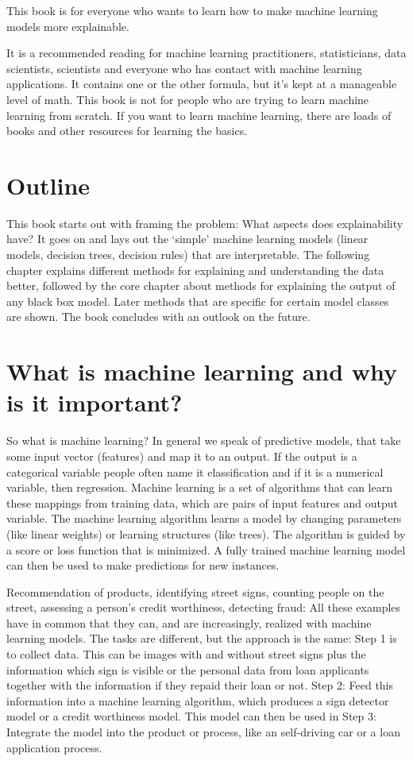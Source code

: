 \documentclass[12pt,]{krantz}
\theoremstyle{definition}
\theoremstyle{definition}
\theoremstyle{definition}
\theoremstyle{remark}
\begin{document}
This book is for everyone who wants to learn how to make machine
learning models more explainable.

It is a recommended reading for machine learning practitioners,
statisticians, data scientists, scientists and everyone who has contact
with machine learning applications. It contains one or the other
formula, but it's kept at a manageable level of math. This book is not
for people who are trying to learn machine learning from scratch. If you
want to learn machine learning, there are loads of books and other
resources for learning the basics.

\section{Outline}\label{outline}

This book starts out with framing the problem: What aspects does
explainability have? It goes on and lays out the `simple' machine
learning models (linear models, decision trees, decision rules) that are
interpretable. The following chapter explains different methods for
explaining and understanding the data better, followed by the core
chapter about methods for explaining the output of any black box model.
Later methods that are specific for certain model classes are shown. The
book concludes with an outlook on the future.

\section{What is machine learning and why is it
important?}\label{what-is-machine-learning-and-why-is-it-important}

So what is machine learning? In general we speak of predictive models,
that take some input vector (features) and map it to an output. If the
output is a categorical variable people often name it classification and
if it is a numerical variable, then regression. Machine learning is a
set of algorithms that can learn these mappings from training data,
which are pairs of input features and output variable. The machine
learning algorithm learns a model by changing parameters (like linear
weights) or learning structures (like trees). The algorithm is guided by
a score or loss function that is minimized. A fully trained machine
learning model can then be used to make predictions for new instances.

Recommendation of products, identifying street signs, counting people on
the street, assessing a person's credit worthiness, detecting fraud: All
these examples have in common that they can, and are increasingly,
realized with machine learning models. The tasks are different, but the
approach is the same: Step 1 is to collect data. This can be images with
and without street signs plus the information which sign is visible or
the personal data from loan applicants together with the information if
they repaid their loan or not. Step 2: Feed this information into a
machine learning algorithm, which produces a sign detector model or a
credit worthiness model. This model can then be used in Step 3:
Integrate the model into the product or process, like an self-driving
car or a loan application process.
\end{document}
